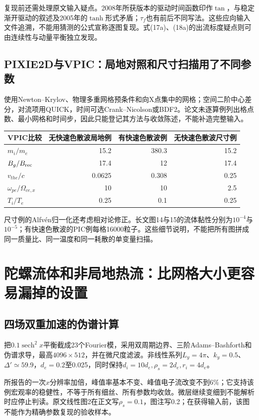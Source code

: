 \documentclass[UTF8,a4paper,11pt,openany,fontset=fandol]{ctexbook}
\begin{document}
复现前还需处理原文输入疑点。2008年所获版本的驱动时间函数印作$\tan$，与稳定渐开驱动的叙述及2005年的$\tanh$形式矛盾；$\tau_f$也有前后不同写法。这些应向输入文件追溯，不能用猜测的公式宣称逐图复现。式(17a)、(18a)的出流标度疑点则可由连续性与动量平衡独立发现。

\subsection{PIXIE2D与VPIC：局地对照和尺寸扫描用了不同参数}
\citet{L217}使用Newton--Krylov、物理多重网格预条件和向X点集中的网格；空间二阶中心差分，对流项用QUICK，时间可选Crank--Nicolson或BDF2。论文未逐算例列出格点数、最小网格和时间步，因此只能登记其方法与收敛陈述，不能补造完整输入。

\begin{center}\small
\begin{tabular}{lrrr}\toprule
VPIC比较 & 无快速色散波局地例 & 有快速色散波例 & 无快速色散波尺寸例\\\midrule
$m_i/m_e$ &15.2&380.3&15.2\\
$B_g/B_{\rm rec}$ &17.4&12&17.4\\
$v_{the}/c$ &0.0625&0.308&0.25\\
$\omega_{pe}/\Omega_{ce,x}$ &10&10&2.5\\
$T_i/T_e$ &0.25&0.1&0.25\\\bottomrule
\end{tabular}\end{center}
尺寸例的Alfvén归一化还考虑相对论修正。长文图14与15的流体黏性分别为$10^{-4}$与$10^{-5}$；有快速色散波的PIC例每格16000粒子。这些细节说明，不能把所有图拼成同一质量比、同一温度和同一耗散的单变量扫描。\citep{L216,L217}

\section{陀螺流体和非局地热流：比网格大小更容易漏掉的设置}
\subsection{四场双重加速的伪谱计算}
\citet{F672}把$0.1\operatorname{sech}^2x$平衡截成23个Fourier模，采用双周期边界、三阶Adams--Bashforth和伪谱求导，最高$4096\times512$，并在微尺度滤波。非线性系列$L_y=4\pi$、$k_y=0.5$、$\Delta'\simeq59.9$，$d_e=0.2$至0.025，同时保持$d_i=10d_e,\rho_s=2d_e,r_i=4d_e$。

所报告的一次$x$分辨率加倍，峰值率基本不变、峰值电子流改变不到6\%；它支持该例宏观率的稳健性，不等于所有细丝、所有参数均收敛。微层继续变细到不能解析时应停止判读。原文线性图2在正文写$\rho_s=0.1$，图注写0.2；在获得输入前，该图不能作为精确参数复现的验收样本。
\end{document}

